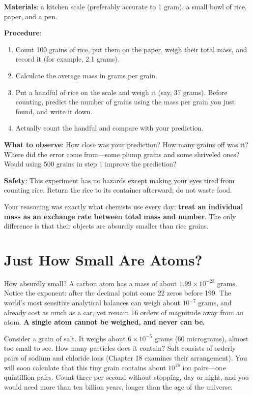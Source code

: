 \begin{shiyan}
\textbf{Materials}: a kitchen scale (preferably accurate to 1 gram), a small bowl of rice, paper, and a pen.

\textbf{Procedure}:
\begin{enumerate}[itemsep=1pt]
\item Count 100 grains of rice, put them on the paper, weigh their total mass, and record it (for example, 2.1 grams).
\item Calculate the average mass in grams per grain.
\item Put a handful of rice on the scale and weigh it (say, 37 grams). Before counting, predict the number of grains using the mass per grain you just found, and write it down.
\item Actually count the handful and compare with your prediction.
\end{enumerate}

\textbf{What to observe}: How close was your prediction? How many grains off was it? Where did the error come from---some plump grains and some shriveled ones? Would using 500 grains in step 1 improve the prediction?

\textbf{Safety}: This experiment has no hazards except making your eyes tired from counting rice. Return the rice to its container afterward; do not waste food.
\end{shiyan}

Your reasoning was exactly what chemists use every day: \textbf{treat an individual mass as an exchange rate between total mass and number}. The only difference is that their objects are absurdly smaller than rice grains.

\section{Just How Small Are Atoms?}

How absurdly small? A carbon atom has a mass of about $1.99\times 10^{-23}$ grams. Notice the exponent: after the decimal point come 22 zeros before 199. The world's most sensitive analytical balances can weigh about $10^{-7}$ grams, and already cost as much as a car, yet remain 16 orders of magnitude away from an atom. \textbf{A single atom cannot be weighed, and never can be.}

Consider a grain of salt. It weighs about $6\times 10^{-5}$ grams (60 micrograms), almost too small to see. How many particles does it contain? Salt consists of orderly pairs of sodium and chloride ions (Chapter 18 examines their arrangement). You will soon calculate that this tiny grain contains about $10^{18}$ ion pairs---one quintillion pairs. Count three per second without stopping, day or night, and you would need more than ten billion years, longer than the age of the universe.

